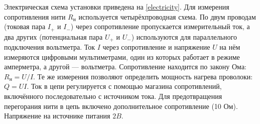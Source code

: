 \documentclass[12pt]{article}
\begin{document}
        Электрическая схема установки приведена на \ref{electricity}. Для измерения сопротивления нити $R_{\text{н}}$
        используется четырёхпроводная схема. По двум проводам (токовая пара $I_{+}$ и $I_{-}$) через сопротивление
        пропускается измерительный ток, а два других (потенциальная пара $U_{+}$ и $U_{-}$) используются
        для параллельного подключения вольтметра. Ток $I$ через сопротивление и напряжение $U$ на нём
        измеряются цифровыми мультиметрами, один из которых работает в режиме амперметра, а другой — вольтметра.
        Сопротивление находится по закону Ома: $R_{\text{н}} = U/I$. Те же измерения позволяют определить мощность
        нагрева проволоки: $Q = UI$. Ток в цепи регулируется с помощью магазина сопротивлений, включённого
        последовательно с источником тока. Для предотвращения перегорания нити в цепь включено дополнительное
        сопротивление (10 Ом). Напряжение на источнике питания $2 B$.
\end{document}

